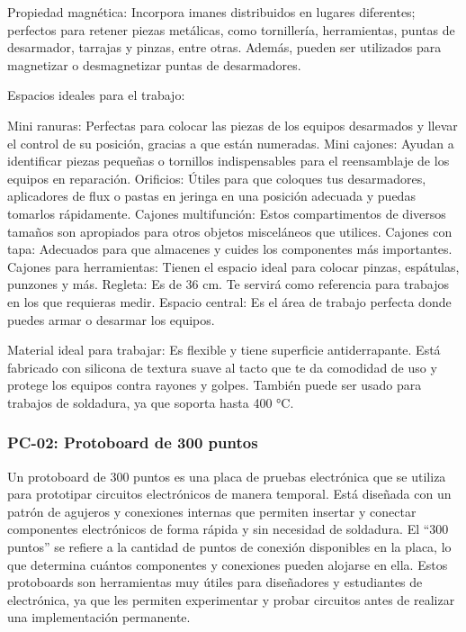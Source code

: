     
    Propiedad magnética: Incorpora imanes distribuidos en lugares diferentes; perfectos para retener piezas metálicas, como tornillería, herramientas, puntas de desarmador, tarrajas y pinzas, entre otras. Además, pueden ser utilizados para magnetizar o desmagnetizar puntas de desarmadores.
    
    
    Espacios ideales para el trabajo:
    
    Mini ranuras: Perfectas para colocar las piezas de los equipos desarmados y llevar el control de su posición, gracias a que están numeradas.
    Mini cajones: Ayudan a identificar piezas pequeñas o tornillos indispensables para el reensamblaje de los equipos en reparación.
    Orificios: Útiles para que coloques tus desarmadores, aplicadores de flux o pastas en jeringa en una posición adecuada y puedas tomarlos rápidamente.
    Cajones multifunción: Estos compartimentos de diversos tamaños son apropiados para otros objetos misceláneos que utilices.
    Cajones con tapa: Adecuados para que almacenes y cuides los componentes más importantes.
    Cajones para herramientas: Tienen el espacio ideal para colocar pinzas, espátulas, punzones y más.
    Regleta: Es de 36 cm. Te servirá como referencia para trabajos en los que requieras medir.
    Espacio central: Es el área de trabajo perfecta donde puedes armar o desarmar los equipos.
    
    Material ideal para trabajar: Es flexible y tiene superficie antiderrapante. Está fabricado con silicona de textura suave al tacto que te da comodidad de uso y protege los equipos contra rayones y golpes. También puede ser usado para trabajos de soldadura, ya que soporta hasta 400 °C.
    
    
    
    \subsubsection{PC-02: Protoboard de 300 puntos}
    
    Un protoboard de 300 puntos es una placa de pruebas electrónica que se utiliza para prototipar circuitos electrónicos de manera temporal. Está diseñada con un patrón de agujeros y conexiones internas que permiten insertar y conectar componentes electrónicos de forma rápida y sin necesidad de soldadura. El “300 puntos” se refiere a la cantidad de puntos de conexión disponibles en la placa, lo que determina cuántos componentes y conexiones pueden alojarse en ella. Estos protoboards son herramientas muy útiles para diseñadores y estudiantes de electrónica, ya que les permiten experimentar y probar circuitos antes de realizar una implementación permanente.
    
